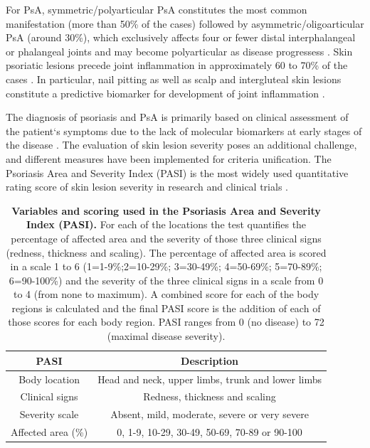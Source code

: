 For PsA, symmetric/polyarticular PsA constitutes the most common manifestation (more than 50\% of the cases) followed by asymmetric/oligoarticular PsA (around 30\%), which exclusively affects four or fewer distal interphalangeal or phalangeal joints and may become polyarticular as disease progressess \parencite{Reich2009, McGonagle2011}. Skin psoriatic lesions precede joint inflammation in approximately 60 to 70\% of the cases \parencite{Gladman2005, McGonagle2011}. In particular, nail pitting as well as scalp and intergluteal skin lesions constitute a predictive biomarker for development of joint inflammation \parencite{Moll1973,Griffiths2007,McGonagle2011}.

The diagnosis of psoriasis and PsA is primarily based on clinical assessment of the patient`s symptoms due to the lack of molecular biomarkers at early stages of the disease \parencite{Villanova2013}. The evaluation of skin lesion severity poses an additional challenge, and different measures have been implemented for criteria unification. The Psoriasis Area and Severity Index (PASI) is the most widely used quantitative rating score of skin lesion severity in research and clinical trials \parencite{Fredriksson1978,Finlay2005}. 


\begin{table}[htbp]
\centering
\setlength{\tabcolsep}{20pt}
\renewcommand{\arraystretch}{1.0}
\begin{tabular}{@{} c c}
\toprule
\textbf{PASI} & \textbf{Description} \\
\midrule
\midrule
Body location  & Head and neck, upper limbs, trunk and lower limbs\\
Clinical signs & Redness, thickness and scaling \\
Severity scale & Absent, mild, moderate, severe or very severe \\
Affected area (\%)  & 0, 1-9, 10-29, 30-49, 50-69, 70-89 or 90-100 \\
\bottomrule
\end{tabular}
\medskip %
\caption[Variables and scoring used in the Psoriasis Area and Severity Index (PASI)]{\textbf{Variables and scoring used in the Psoriasis Area and Severity Index (PASI).} For each of the locations the test quantifies the percentage of affected area and the severity of those three clinical signs (redness, thickness and scaling). The percentage of affected area is scored in a scale 1 to 6 (1=1-9\%;2=10-29\%; 3=30-49\%; 4=50-69\%; 5=70-89\%; 6=90-100\%) and the severity of
the three clinical signs in a scale from 0 to 4 (from none to maximum). A combined score for each of the body regions is calculated %
and the final PASI score is the addition of each of those scores for each body region. PASI ranges from 0 (no disease) to 72 (maximal disease severity).}
\label{tab:PASI}
\end{table}
\smallskip %

